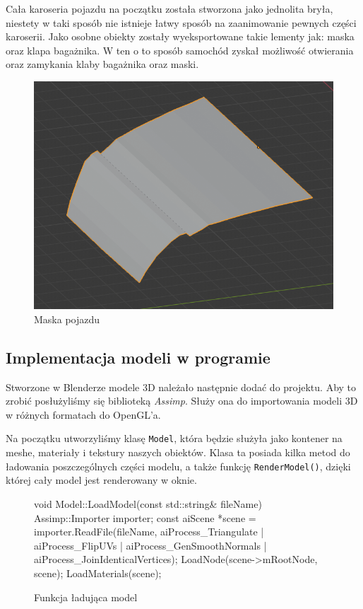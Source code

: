 \documentclass[a4paper,12pt]{article}
\numberwithin{equation}{section}
\begin{document}
Cała karoseria pojazdu na początku została stworzona jako jednolita bryła, niestety w taki sposób nie istnieje łatwy sposób na zaanimowanie pewnych części karoserii. Jako osobne obiekty zostały wyeksportowane takie lementy jak: maska oraz klapa bagażnika. W ten o to sposób samochód zyskał możliwość otwierania oraz zamykania klaby bagażnika oraz maski. 

\begin{figure}[H]
    \centering
    \includegraphics[width=\textwidth]{maska.png}
    \caption{Maska pojazdu}
    \label{fig:maska}
\end{figure}


\subsection{Implementacja modeli w programie}
Stworzone w Blenderze modele 3D należało następnie dodać do projektu. Aby to zrobić posłużyliśmy się biblioteką \textit{Assimp}. Służy ona do importowania modeli 3D w różnych formatach do OpenGL'a.

Na początku utworzyliśmy klasę \texttt{Model}, która będzie służyła jako kontener na meshe, materiały i tekstury naszych obiektów. Klasa ta posiada kilka metod do ładowania poszczególnych części modelu, a także funkcję \texttt{RenderModel()}, dzięki której cały model jest renderowany w oknie.

\begin{figure}[H]
\begin{cppcode}
void Model::LoadModel(const std::string& fileName)
{
	Assimp::Importer importer;
	const aiScene *scene = importer.ReadFile(fileName, aiProcess_Triangulate | aiProcess_FlipUVs | aiProcess_GenSmoothNormals | aiProcess_JoinIdenticalVertices);
	LoadNode(scene->mRootNode, scene);
	LoadMaterials(scene);
}
\end{cppcode}
\caption{Funkcja ładująca model}
\end{figure}
\end{document}
